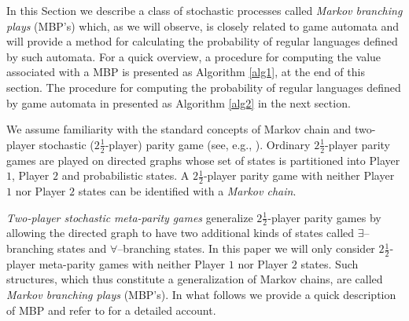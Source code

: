 

In this Section we describe a class of stochastic processes called \emph{Markov branching plays} (MBP's) \cite{MioThesis,MIO2012b}  which, as we will observe, is closely related to game automata and will provide a method for calculating the probability of regular languages defined by such automata.  
For a quick overview, a procedure for computing the value associated with a MBP is presented as Algorithm \ref{alg1}, at the end of this section. The procedure for computing the probability  of regular languages defined by game automata in presented as Algorithm \ref{alg2} in the next section.



We assume familiarity with the standard concepts of Markov chain and two-player stochastic ($2\frac{1}{2}$-player) parity game (see, e.g.,  \cite{ChatPhD}).  Ordinary $2\frac{1}{2}$-player parity games are played on directed graphs whose set of states is partitioned into Player $1$, Player $2$ and probabilistic states. A $2\frac{1}{2}$-player parity game with neither Player $1$ nor Player $2$ states can be identified with a \emph{Markov chain}. 



\begin{comment}
Recall that ordinary $2\frac{1}{2}$-player parity games  are played on directed graphs whose set of states is partitioned into Player $1$ and Player $2$ states, where the two players make their moves, and probabilistic states, where the game progresses to a successor state following a prescribed probabilistic rule. A $2\frac{1}{2}$-player parity game without Player $2$ states is called a \emph{Markov Decision Process} (MDP). A $2\frac{1}{2}$-player parity game with neither Player $1$ nor Player $2$ states (i.e., only having probabilistic states) can be identified with a \emph{Markov chain}. \todo{Here I uncommented certain piece which was reserved for the journal version.}
\end{comment}

\emph{Two-player stochastic} \emph{meta-parity games} \cite{MioThesis,MIO2012b} generalize $2\frac{1}{2}$-player parity games by allowing the directed graph to have two additional kinds of states called $\exists$--branching states and $\forall$--branching states. In this paper we will only consider $2\frac{1}{2}$-player meta-parity games with neither Player $1$ nor Player $2$ states. Such structures, which thus constitute a generalization of Markov chains, are called \emph{Markov branching plays} (MBP's). In what follows we provide a quick description of MBP and refer to \cite{MioThesis} for a detailed account.


